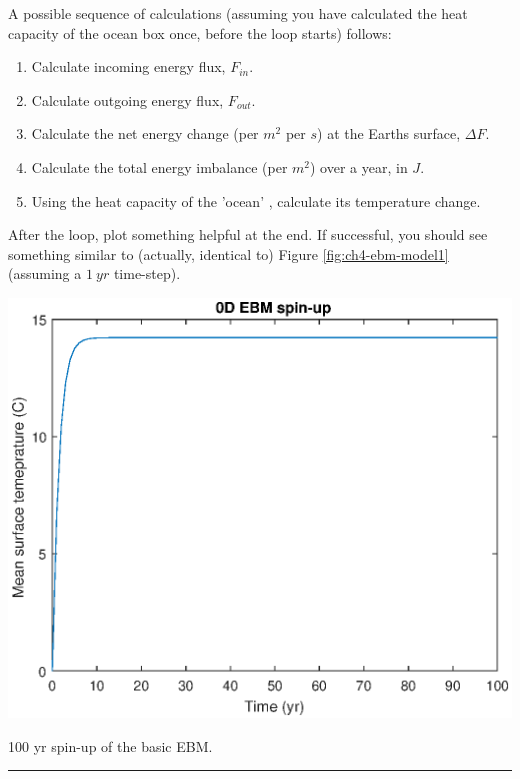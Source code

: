 \documentclass{tufte-book} %
\begin{document}
A possible sequence of calculations (assuming you have calculated the heat capacity of the ocean box once, before the loop starts) follows:
\begin{enumerate}[noitemsep]
\setlength{\itemindent}{.2in}
\item Calculate incoming energy flux, \(F_{in}\).
\item Calculate outgoing energy flux, \(F_{out}\).
\item Calculate the net energy change (per \(m^{2}\) per \(s\)) at the Earths surface, \(\Delta F\).
\item Calculate the total energy imbalance (per \(m^{2}\)) over a year, in \(J\).
\item Using the heat capacity of the 'ocean' , calculate its temperature change.
\end{enumerate}
After the loop, plot something helpful at the end. 
If successful, you should see something similar to (actually, identical to) Figure \ref{fig:ch4-ebm-model1} (assuming a \(1\:yr\) time-step).

\begin{marginfigure}[-4.0in]
\includegraphics[width=\linewidth]{ch4-ebm-model1.eps}
\caption{100 yr spin-up of the basic EBM.}
\label{fig:ch4-ebm-model1}
\end{marginfigure}

\vspace{1mm}
\noindent\rule{4cm}{0.5pt}
\vspace{2mm}
\end{document}
